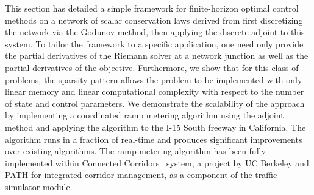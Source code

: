 This section has detailed a simple framework for finite-horizon optimal control 
methods on a network of scalar conservation laws derived from first 
discretizing the network via the Godunov method, then applying the discrete 
adjoint to this system. To tailor the framework to a specific application, one 
need only provide the partial derivatives of the Riemann solver at a network 
junction as well as the partial derivatives of the objective. Furthermore, we 
show that for this class of problems, the sparsity pattern allows the problem 
to be implemented with only linear memory and linear computational complexity 
with respect to the number of state and control parameters. We demonstrate the 
scalability of the approach by implementing a coordinated ramp metering 
algorithm using the adjoint method and applying the algorithm to the I-15 South 
freeway in California. The algorithm runs in a fraction of real-time 
and produces significant improvements over existing algorithms. The ramp 
metering algorithm has been fully implemented within Connected 
Corridors~\cite{CC} system, a project by UC Berkeley and PATH for integrated 
corridor management, as a component of the traffic simulator module.